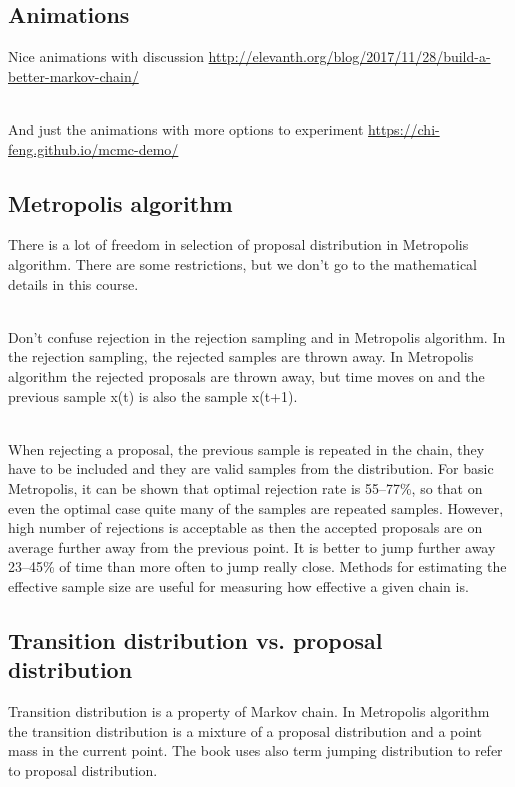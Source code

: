 \documentclass[a4paper,11pt,english]{article}
\begin{document}
\subsection*{Animations}

Nice animations with discussion
\url{http://elevanth.org/blog/2017/11/28/build-a-better-markov-chain/}

~\\
And just the animations with more options to experiment
\url{https://chi-feng.github.io/mcmc-demo/}

\subsection*{Metropolis algorithm}

There is a lot of freedom in selection of proposal distribution in
Metropolis algorithm. There are some restrictions, but we don't go to
the mathematical details in this course.

~\\
Don't confuse rejection in the rejection sampling and in Metropolis
algorithm. In the rejection sampling, the rejected samples are thrown
away. In Metropolis algorithm the rejected proposals are thrown away,
but time moves on and the previous sample x(t) is also the sample
x(t+1).

~\\
When rejecting a proposal, the previous sample is repeated in the
chain, they have to be included and they are valid samples from the
distribution. For basic Metropolis, it can be shown that optimal
rejection rate is 55--77\%, so that on even the optimal case quite many
of the samples are repeated samples. However, high number of
rejections is acceptable as then the accepted proposals are on average
further away from the previous point. It is better to jump further
away 23--45\% of time than more often to jump really close. Methods for
estimating the effective sample size are useful for measuring how
effective a given chain is.

\subsection*{Transition distribution vs. proposal distribution}

Transition distribution is a property of Markov chain. In Metropolis
algorithm the transition distribution is a mixture of a proposal
distribution and a point mass in the current point. The book uses also
term jumping distribution to refer to proposal distribution.
\end{document}
